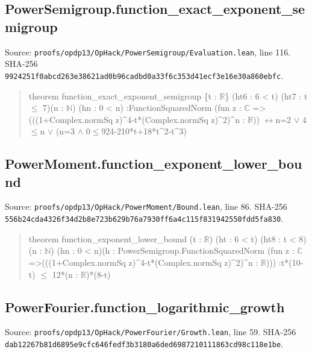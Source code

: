 \documentclass[11pt,a4paper]{article}
\begin{document}
\subsection{PowerSemigroup.function\_exact\_exponent\_semigroup}
Source: \texttt{proofs/opdp13/OpHack/PowerSemigroup/Evaluation.lean}, line 116. SHA-256 \texttt{9924251f0abcd263e38621ad0b96cadbd0a33f6c353d41ecf3e16e30a860ebfc}.

\begin{quote}\small\ttfamily theorem function\_exact\_exponent\_semigroup \{t : \ensuremath{\mathbb{R}}\} (ht6 : 6 < t) (ht7 : t \ensuremath{\leq} 7)\newline (n : \ensuremath{\mathbb{N}}) (hn : 0 < n) :\newline FunctionSquaredNorm (fun z : \ensuremath{\mathbb{C}} =>\newline (((1+Complex.normSq z)\textasciicircum{}4-t*(Complex.normSq z)\textasciicircum{}2)\textasciicircum{}n : \ensuremath{\mathbb{R}})) \ensuremath{\leftrightarrow}\newline n=2 \ensuremath{\vee} 4\ensuremath{\leq}n \ensuremath{\vee} (n=3 \ensuremath{\wedge} 0\ensuremath{\leq}924-210*t+18*t\textasciicircum{}2-t\textasciicircum{}3)\end{quote}
\subsection{PowerMoment.function\_exponent\_lower\_bound}
Source: \texttt{proofs/opdp13/OpHack/PowerMoment/Bound.lean}, line 86. SHA-256 \texttt{556b24cda4326f34d2b8e723b629b76a7930ff6a4c115f831942550fdd5fa830}.

\begin{quote}\small\ttfamily theorem function\_exponent\_lower\_bound (t : \ensuremath{\mathbb{R}}) (ht : 6 < t) (ht8 : t < 8)\newline (n : \ensuremath{\mathbb{N}}) (hn : 0 < n)\newline (h : PowerSemigroup.FunctionSquaredNorm (fun z : \ensuremath{\mathbb{C}} =>\newline (((1+Complex.normSq z)\textasciicircum{}4-t*(Complex.normSq z)\textasciicircum{}2)\textasciicircum{}n : \ensuremath{\mathbb{R}}))) :\newline t*(10-t) \ensuremath{\leq} 12*(n : \ensuremath{\mathbb{R}})*(8-t)\end{quote}
\subsection{PowerFourier.function\_logarithmic\_growth}
Source: \texttt{proofs/opdp13/OpHack/PowerFourier/Growth.lean}, line 59. SHA-256 \texttt{dab12267b81d6895e9cfc646fedf3b3180a6ded6987210111863cd98c118e1be}.
\end{document}
